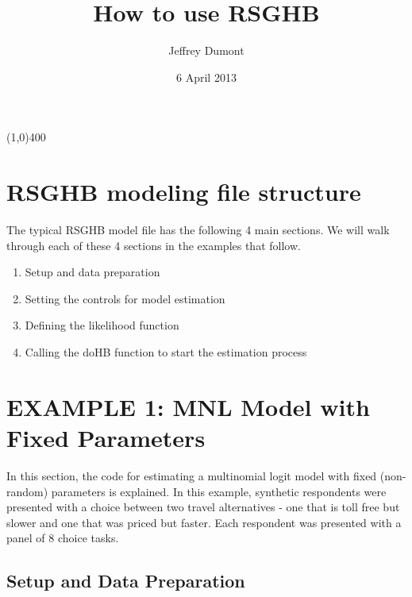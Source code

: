 \documentclass{article}
\begin{document}
\title{How to use RSGHB}
\author{Jeffrey Dumont}
\date{6 April 2013}
\maketitle
{}

\begin{center}
\line(1,0){400}
\end{center}

\section*{RSGHB modeling file structure}

The typical RSGHB model file has the following 4 main sections. We will walk through each of these 4 sections in the examples that follow.

\begin{enumerate}
     \item Setup and data preparation
     \item Setting the controls for model estimation
     \item Defining the likelihood function
     \item Calling the doHB function to start the estimation process
\end{enumerate}

\section*{EXAMPLE 1: MNL Model with Fixed Parameters}

In this section, the code for estimating a multinomial logit model with fixed (non-random) parameters is explained. In this example, synthetic respondents were presented with a choice between two travel alternatives - one that is toll free but slower and one that was priced but faster. Each respondent was presented with a panel of 8 choice tasks.

\subsection*{Setup and Data Preparation}
\end{document}
